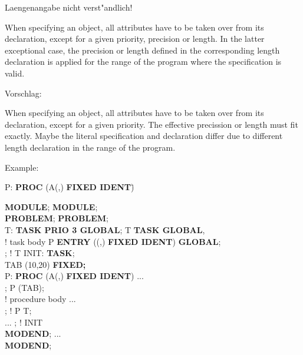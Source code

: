 \begin{discuss}
Laengenangabe nicht verst"andlich!

\begin{removed}
When specifying an object, all attributes have to be taken over from its
declaration, except for a given priority, precision or length. In the
latter exceptional case, the precision or length defined in the
corresponding length declaration is applied for the range of the program
where the specification is valid.
\end{removed}

Vorschlag:\\
\begin{added}
When specifying an object, all attributes have to be taken over from its
declaration, except for a given priority. The effective precission or length 
must fit exactly. Maybe the literal specification and declaration differ 
due to different length declaration in the range of the program.
\end{added} 

\end{discuss}

Example:



\begin{tabbing}
\x P: {\bf PROC} (A(,) {\bf FIXED IDENT})\=  \kill

{\bf MODULE};                     \> {\bf MODULE};\\
{\bf PROBLEM};                    \> {\bf PROBLEM};\\
\x T: {\bf TASK PRIO 3 GLOBAL};   \>  T {\bf TASK GLOBAL},\\
\x \x \x ! task body              \> \x \x P {\bf ENTRY} ((,) {\bf FIXED IDENT}) {\bf GLOBAL};\\
; ! T              \> \x INIT: {\bf TASK};\\
                                  \> \x {} TAB (10,20) {\bf FIXED;}\\
\x P: {\bf PROC} (A(,) {\bf FIXED IDENT}) \> \x \x ...\\
\x \x \x {};         \> \x {} P (TAB);\\
\x \x \x ! procedure body         \> \x \x ... \\
; ! P              \> \x {} T;\\
\x ...                            \> ; ! INIT\\
{\bf MODEND};                     \> \x ...\\
                                  \> {\bf MODEND};
\end{tabbing}

